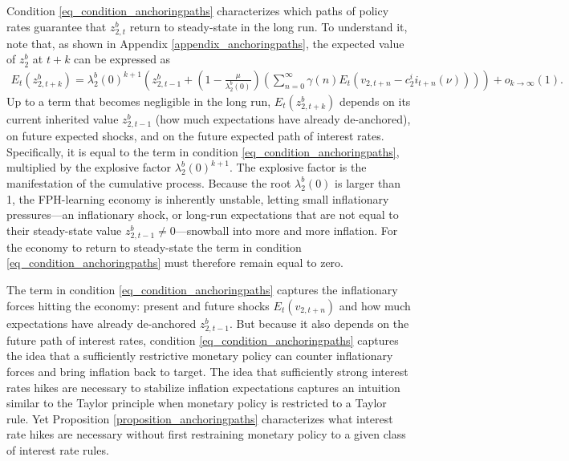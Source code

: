 \documentclass{article}
\begin{document}
Condition \eqref{eq_condition_anchoringpaths} characterizes which paths of policy rates guarantee that $z^b_{2,t}$ return to steady-state in the long run. To understand it, note that, as shown in Appendix \ref{appendix_anchoringpaths}, the expected value of $z_{2}^b$ at $t+k$ can be expressed as
\begin{align}
E_t(z_{2,t+k}^b) = \lambda^b_2(0)^{k+1} \left(z^b_{2,t-1} + \left(1-\frac{\mu}{\lambda^b_2(0)}\right) \left(
\sum_{n=0}^\infty \gamma(n) E_t(v_{2,t+n}-c^i_2 i_{t+n}(\nu))\right)\right) + o_{k\rightarrow \infty}(1).\label{eq_z2expression_text}
\end{align}
Up to a term that becomes negligible in the long run, $E_t(z_{2,t+k}^b)$ depends on its current inherited value $z^b_{2,t-1}$ (how much expectations have already de-anchored), on future expected shocks, and on the future expected path of interest rates. Specifically, it is equal to the term in condition \eqref{eq_condition_anchoringpaths}, multiplied by the explosive factor $\lambda^b_2(0)^{k+1}$. The explosive factor is the manifestation of the cumulative process. Because the root $\lambda^b_2(0)$ is larger than 1, the FPH-learning economy is inherently unstable, letting small inflationary pressures---an inflationary shock, or long-run expectations that are not equal to their steady-state value $z^b_{2,t-1} \neq 0$---snowball into more and more inflation. For the economy to return to steady-state the term in condition \eqref{eq_condition_anchoringpaths} must therefore remain equal to zero.

The term in condition \eqref{eq_condition_anchoringpaths} captures the inflationary forces hitting the economy: present and future shocks $E_t(v_{2,t+n})$ and how much expectations have already de-anchored $z^b_{2,t-1}$. But because it also depends on the future path of interest rates, condition \eqref{eq_condition_anchoringpaths} captures the idea that a sufficiently restrictive monetary policy can counter inflationary forces and bring inflation back to target. The idea that sufficiently strong interest rates hikes are necessary to stabilize inflation expectations captures an intuition similar to the Taylor principle when monetary policy is restricted to a Taylor rule. Yet Proposition \ref{proposition_anchoringpaths} characterizes what interest rate hikes are necessary without first restraining monetary policy to a given class of interest rate rules. 
\end{document}
